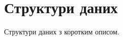 \section{Структури даних}
Структури даних з коротким описом.\begin{DoxyCompactList}
\item{}
\end{DoxyCompactList}
